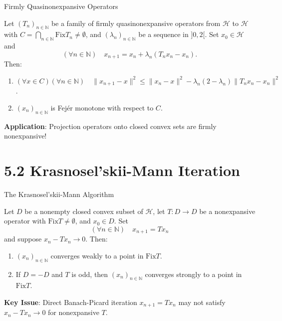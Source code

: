 \documentclass[aspectratio=169,10pt]{beamer}
\begin{document}
\begin{frame}{Firmly Quasinonexpansive Operators}
    \begin{theorem}[Proposition 5.13]
        Let $(T_n)_{n \in \mathbb{N}}$ be a family of firmly quasinonexpansive operators from $\mathcal{H}$ to $\mathcal{H}$ with $C = \bigcap_{n \in \mathbb{N}} \text{Fix} T_n \neq \emptyset$, and $(\lambda_n)_{n \in \mathbb{N}}$ be a sequence in $]0, 2[$.
        Set $x_0 \in \mathcal{H}$ and
        \[
            (\forall n \in \mathbb{N}) \quad x_{n+1} = x_n + \lambda_n(T_n x_n - x_n).
        \]
        Then:
        \begin{enumerate}
            \item $(\forall x \in C)(\forall n \in \mathbb{N}) \quad \|x_{n+1} - x\|^2 \leq \|x_n - x\|^2 - \lambda_n(2 - \lambda_n)\|T_n x_n - x_n\|^2$.
            \item $(x_n)_{n \in \mathbb{N}}$ is Fejér monotone with respect to $C$.
        \end{enumerate}
    \end{theorem}

    \vspace{0.2cm}

    \textbf{Application}: Projection operators onto closed convex sets are firmly nonexpansive!
\end{frame}

\section{5.2 Krasnosel'skii-Mann Iteration}

\begin{frame}{The Krasnosel'skii-Mann Algorithm}
    \begin{theorem}[Theorem 5.14]
        Let $D$ be a nonempty closed convex subset of $\mathcal{H}$, let $T: D \to D$ be a nonexpansive operator with $\text{Fix} T \neq \emptyset$, and $x_0 \in D$.
        Set
        \[
            (\forall n \in \mathbb{N}) \quad x_{n+1} = T x_n
        \]
        and suppose $x_n - T x_n \to 0$. Then:
        \begin{enumerate}
            \item $(x_n)_{n \in \mathbb{N}}$ converges weakly to a point in $\text{Fix} T$.
            \item If $D = -D$ and $T$ is odd, then $(x_n)_{n \in \mathbb{N}}$ converges strongly to a point in $\text{Fix} T$.
        \end{enumerate}
    \end{theorem}

    \vspace{0.3cm}

    \textbf{Key Issue}: Direct Banach-Picard iteration $x_{n+1} = Tx_n$ may not satisfy $x_n - Tx_n \to 0$ for nonexpansive $T$.
\end{frame}
\end{document}
